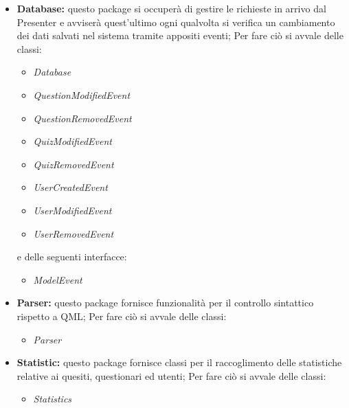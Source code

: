 \documentclass[a4paper,11pt]{article}
\begin{document}
	\begin{itemize}
		\item\textbf{Database:} questo package si occuperà di gestire le richieste in arrivo dal Presenter e avviserà quest'ultimo ogni qualvolta si verifica un cambiamento dei dati salvati nel sistema tramite appositi eventi; Per fare ciò si avvale delle classi:
			\begin{itemize}
				\item\textit{Database}
				\item\textit{QuestionModifiedEvent}
				\item\textit{QuestionRemovedEvent}
				\item\textit{QuizModifiedEvent}
				\item\textit{QuizRemovedEvent}
				\item\textit{UserCreatedEvent}
				\item\textit{UserModifiedEvent}
				\item\textit{UserRemovedEvent}
			\end{itemize}
				e delle seguenti interfacce:
			\begin{itemize}
				\item\textit{ModelEvent}
			\end{itemize}
		\item\textbf{Parser:} questo package fornisce funzionalità per il controllo sintattico rispetto a QML; Per fare ciò si avvale delle classi:
			\begin{itemize}
				\item\textit{Parser}
			\end{itemize}
		\item\textbf{Statistic:} questo package fornisce classi per il raccoglimento delle statistiche relative ai quesiti, questionari ed utenti; Per fare ciò si avvale delle classi:
			\begin{itemize}
				\item\textit{Statistics}
			\end{itemize}
		\end{itemize}
		\newpage
	
\end{document}
